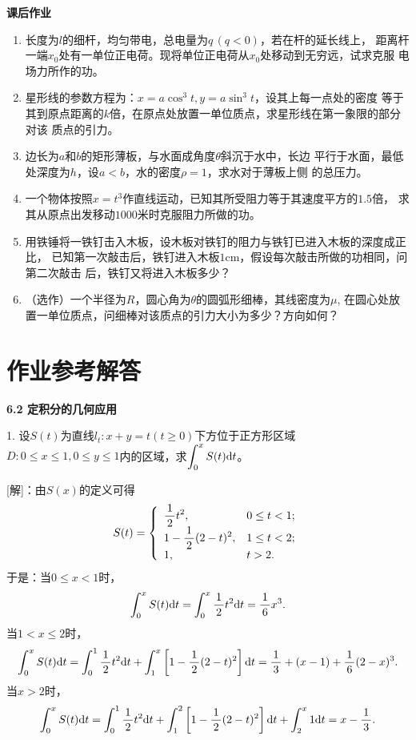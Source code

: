 \begin{ext}
	{\bf 课后作业}
	\begin{enumerate}
	  \item 长度为$l$的细杆，均匀带电，总电量为$q\,(q<0)$，若在杆的延长线上，
	  距离杆一端$x_0$处有一单位正电荷。现将单位正电荷从$x_0$处移动到无穷远，试求克服
	  电场力所作的功。
	  \item 星形线的参数方程为：$x=a\cos^3t,y=a\sin^3t$，设其上每一点处的密度
	  等于其到原点距离的$k$倍，在原点处放置一单位质点，求星形线在第一象限的部分对该
	  质点的引力。
	  \item 边长为$a$和$b$的矩形薄板，与水面成角度$\theta$斜沉于水中，长边
	  平行于水面，最低处深度为$h$，设$a<b$，水的密度$\rho=1$，求水对于薄板上侧
	  的总压力。
	  \item 一个物体按照$x=t^3$作直线运动，已知其所受阻力等于其速度平方的$1.5$倍，
	  求其从原点出发移动$1000$米时克服阻力所做的功。
	  \item 用铁锤将一铁钉击入木板，设木板对铁钉的阻力与铁钉已进入木板的深度成正比，
	  已知第一次敲击后，铁钉进入木板$1$cm，假设每次敲击所做的功相同，问第二次敲击
	  后，铁钉又将进入木板多少？
	  \item （选作）一个半径为$R$，圆心角为$\theta$的圆弧形细棒，其线密度为$\mu$,
	  在圆心处放置一单位质点，问细棒对该质点的引力大小为多少？方向如何？
	\end{enumerate}
\end{ext}

\newpage

\section*{作业参考解答}

\begin{center}
	\bf 6.2 定积分的几何应用
\end{center}

\bs

1. 设$S(t)$为直线$l_t:x+y=t(t\geq0)$下方位于正方形区域
$D:0\leq x\leq 1,0\leq y\leq 1$内的区域，求$\displaystyle\int_0^xS(t)\mathrm{d} t$。

[解]：由$S(x)$的定义可得
$$S(t)=\left\{\begin{array}{ll}
	\displaystyle\frac{\,{1}\,}{\,{2}\,}t^2,& 0\leq t<1;\\ 1-\displaystyle\frac{\,{1}\,}{\,{2}\,}(2-t)^2, & 1\leq t <2;\\
	1,& t>2. 
\end{array}\right.$$
于是：当$0\leq x<1$时，
$$\displaystyle\int_0^xS(t)\mathrm{d} t=\displaystyle\int_0^x\displaystyle\frac{\,{1}\,}{\,{2}\,}t^2\mathrm{d} t=\displaystyle\frac{\,{1}\,}{\,{6}\,}x^3.$$
当$1<x\leq2$时，
$$\displaystyle\int_0^xS(t)\mathrm{d} t=\displaystyle\int_0^1\displaystyle\frac{\,{1}\,}{\,{2}\,}t^2\mathrm{d} t
+\displaystyle\int_1^x\left[1-\displaystyle\frac{\,{1}\,}{\,{2}\,}(2-t)^2\right]\mathrm{d} t
=\displaystyle\frac{\,{1}\,}{\,{3}\,}+(x-1)+\displaystyle\frac{\,{1}\,}{\,{6}\,}(2-x)^3.$$
当$x>2$时，
$$\displaystyle\int_0^xS(t)\mathrm{d} t=\displaystyle\int_0^1\displaystyle\frac{\,{1}\,}{\,{2}\,}t^2\mathrm{d} t
+\displaystyle\int_1^2\left[1-\displaystyle\frac{\,{1}\,}{\,{2}\,}(2-t)^2\right]\mathrm{d} t
+\displaystyle\int_2^x1\mathrm{d} t
=x-\displaystyle\frac{\,{1}\,}{\,{3}\,}.$$
\fin

